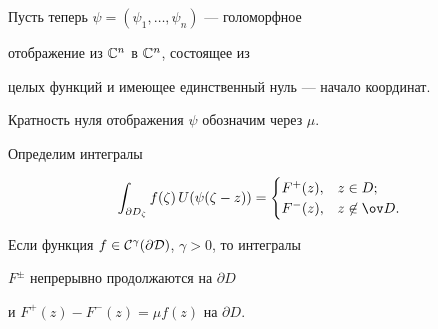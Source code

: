 Пусть теперь $\psi=(\psi_1,\dotsc,\psi _n)$ --- голоморфное 


отображение из ${\Bbb C}^n$ в ${\Bbb C}^n$, состоящее из 


целых функций и имеющее единственный нуль --- начало координат.


Кратность нуля отображения $\psi$ обозначим через $\mu$.





Определим интегралы


$$


\int_{\partial D_\zeta }f (\zeta)\,U(\psi (\zeta-z))=


\begin{cases} F^+(z), & z\in D;\\


F^-(z), & z\not\in\ov D.


\end{cases}


$$





\begin{lem}


Если функция $f\in\cal C^\gamma(\partial D)$, $\gamma>0$, то интегралы


$F^\pm$ непрерывно продолжаются на $\partial D$


и $F^+(z)-F^-(z)=\mu f(z)$ на $\partial D$.


\end{lem}





